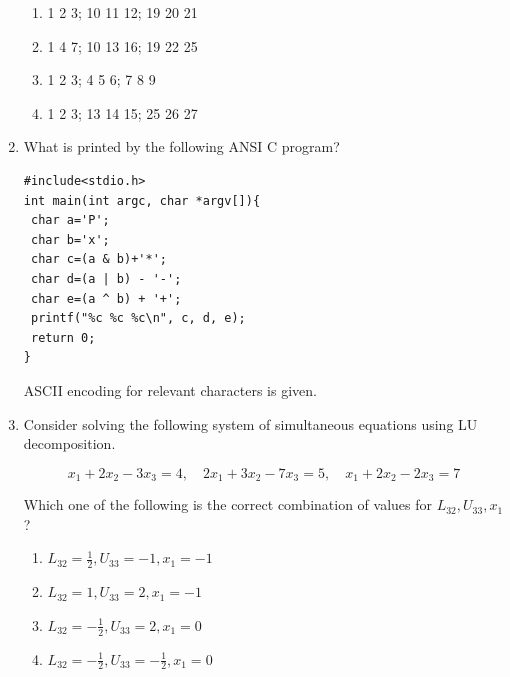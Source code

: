 \begin{enumerate}
\begin{enumerate}
\item 1 2 3; 10 11 12; 19 20 21
\item 1 4 7; 10 13 16; 19 22 25
\item 1 2 3; 4 5 6; 7 8 9
\item 1 2 3; 13 14 15; 25 26 27
\end{enumerate}

\hfill{}

\item What is printed by the following ANSI C program?  

\begin{verbatim}
#include<stdio.h>
int main(int argc, char *argv[]){
 char a='P';
 char b='x';
 char c=(a & b)+'*';
 char d=(a | b) - '-';
 char e=(a ^ b) + '+';
 printf("%c %c %c\n", c, d, e);
 return 0;
}
\end{verbatim}

ASCII encoding for relevant characters is given.




\begin{enumerate}
\end{enumerate}

\hfill{}

\item Consider solving the following system of simultaneous equations using LU decomposition.  

\[
x_1+2x_2-3x_3=4,\quad 2x_1+3x_2-7x_3=5,\quad x_1+2x_2-2x_3=7
\]

Which one of the following is the correct combination of values for $L_{32}, U_{33}, x_1$?  

\begin{enumerate}
\item $L_{32}=\tfrac{1}{2}, U_{33}=-1, x_1=-1$
\item $L_{32}=1, U_{33}=2, x_1=-1$
\item $L_{32}=-\tfrac{1}{2}, U_{33}=2, x_1=0$
\item $L_{32}=-\tfrac{1}{2}, U_{33}=-\tfrac{1}{2}, x_1=0$
\end{enumerate}


\end{enumerate}
